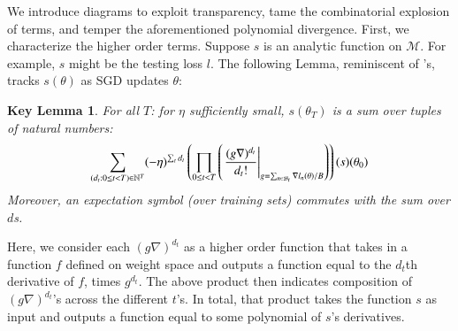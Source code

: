 \documentclass[anon,12pt]{colt2021} %
\newtheorem*{klem*}{Key Lemma}
\newcommand{\wrap}[1]{\left(#1\right)}
\newcommand{\Bb}{\mathcal{B}}
\newcommand{\Mm}{\mathcal{M}}
\begin{document}
            We introduce diagrams to exploit transparency, tame the
            combinatorial explosion of terms, and temper the aforementioned
            polynomial divergence.
            First, we characterize the higher order terms.  Suppose
            $s$ is an analytic function on $\Mm$.  For example, $s$ might be
            the testing loss $l$.  The following Lemma, reminiscent of
            \cite{dy49a}'s, tracks $s(\theta)$ as SGD updates $\theta$:
            \begin{klem*} \label{lem:dyson}
                For all $T$: for $\eta$ sufficiently small, $s(\theta_T)$ is a
                sum over tuples of natural numbers:
                \begin{equation}\label{eq:dyson}
                    \sum_{(d_t: 0\leq t<T) \in \NN^T}
                    (-\eta)^{\sum_t d_t}
                    \wrap{
                        \prod_{0 \leq t < T}
                            \wrap{\left.
                                \frac{(g \nabla)^{d_t}}{d_t!}
                            \right|_{g = \sum_{n\in \Bb_t} \nabla l_n(\theta) / B}}
                    }(s) (\theta_0)
                \end{equation}
                Moreover, an expectation symbol (over training sets) commutes
                with the sum over $d$s.
            \end{klem*}
            Here, we consider each $(g \nabla)^{d_t}$ as a higher order
            function that takes in a function $f$ defined on weight space and
            outputs a function equal to the $d_t$th derivative of $f$, times
            $g^{d_t}$.  The above product then indicates composition of $(g
            \nabla)^{d_t}$'s across the different $t$'s.  In total, that
            product takes the function $s$ as input and outputs a function
            equal to some polynomial of $s$'s derivatives.
\end{document}
